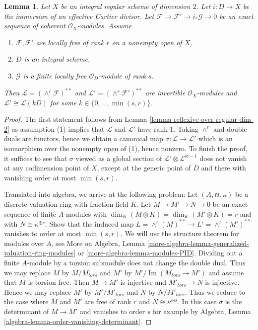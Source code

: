 \documentclass[10pt,a4paper]{amsart}
\theoremstyle{plain}
\newtheorem{lemma}[subsection]{Lemma}
\theoremstyle{definition}
\theoremstyle{remark}
\numberwithin{equation}{subsection}
\def\Im{\mathop{\mathrm{Im}}}
\begin{document}
\begin{lemma}
\label{lemma-wedge-product-ses}
Let $X$ be an integral regular scheme of dimension $2$.
Let $i : D \to X$ be the immersion of an effective Cartier divisor.
Let $\mathcal{F} \to \mathcal{F}' \to i_*\mathcal{G} \to 0$
be an exact sequence of coherent $\mathcal{O}_X$-modules.
Assume
\begin{enumerate}
\item $\mathcal{F}, \mathcal{F}'$ are locally free of rank $r$ on a nonempty
open of $X$,
\item $D$ is an integral scheme,
\item $\mathcal{G}$ is a finite locally free $\mathcal{O}_D$-module
of rank $s$.
\end{enumerate}
Then $\mathcal{L} = (\wedge^r\mathcal{F})^{**}$ and
$\mathcal{L}' = (\wedge^r \mathcal{F}')^{**}$
are invertible $\mathcal{O}_X$-modules and
$\mathcal{L}' \cong \mathcal{L}(k D)$ for some
$k \in \{0, \ldots, \min(s, r)\}$.
\end{lemma}

\begin{proof}
The first statement follows from Lemma \ref{lemma-reflexive-over-regular-dim-2}
as assumption (1) implies that $\mathcal{L}$ and $\mathcal{L}'$
have rank $1$. Taking $\wedge^r$ and double duals are functors, hence
we obtain a canonical map $\sigma : \mathcal{L} \to \mathcal{L}'$
which is an isomorphism over the nonempty open of (1), hence
nonzero. To finish the proof, it suffices to see that
$\sigma$ viewed as a global section of
$\mathcal{L}' \otimes \mathcal{L}^{\otimes -1}$ does not
vanish at any codimension point of $X$, except at the generic
point of $D$ and there with vanishing order at most $\min(s, r)$.

\medskip\noindent
Translated into algebra, we arrive at the following problem:
Let $(A, \mathfrak m, \kappa)$ be a discrete valuation ring
with fraction field $K$. Let $M \to M' \to N \to 0$ be an exact sequence
of finite $A$-modules with $\dim_K(M \otimes K) = \dim_K(M' \otimes K) = r$
and with $N \cong \kappa^{\oplus s}$. Show that the induced map
$L = \wedge^r(M)^{**} \to L' = \wedge^r(M')^{**}$ vanishes to
order at most $\min(s, r)$. We will use the structure theorem for
modules over $A$, see
More on Algebra, Lemma
\ref{more-algebra-lemma-generalized-valuation-ring-modules} or
\ref{more-algebra-lemma-modules-PID}.
Dividing out a finite $A$-module by a torsion submodule does not
change the double dual.
Thus we may replace $M$ by $M/M_{tors}$ and $M'$ by
$M'/\Im(M_{tors} \to M')$ and assume that $M$ is torsion free.
Then $M \to M'$ is injective and $M'_{tors} \to N$ is injective.
Hence we may replace $M'$ by $M'/M'_{tors}$ and $N$ by $N/M'_{tors}$.
Thus we reduce to the case where $M$ and $M'$ are free of rank $r$
and $N \cong \kappa^{\oplus s}$. In this case $\sigma$
is the determinant of $M \to M'$ and vanishes to order $s$
for example by Algebra, Lemma \ref{algebra-lemma-order-vanishing-determinant}.
\end{proof}
\end{document}
